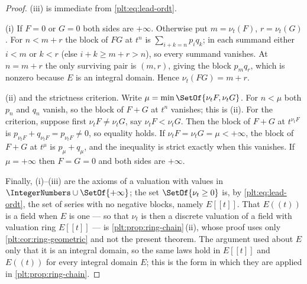 \documentclass[11pt,oneside]{article}
\theoremstyle{plain}
\theoremstyle{definition}
\theoremstyle{remark}
\newcommand{\ordt}{\nu_{t}}                              %
\begin{document}
\begin{proof}
(iii) is immediate from \eqref{plt:eq:lead-ordt}.

(i)  If \(F=0\) or \(G=0\) both sides are \(+\infty\).  Otherwise put
\(m=\ordt(F)\), \(r=\ordt(G)\).  For \(n<m+r\) the block of \(FG\) at \(t^n\)
is \(\sum_{i+k=n}p_iq_k\); in each summand either \(i<m\) or \(k<r\) (else
\(i+k\ge m+r>n\)), so every summand vanishes.  At \(n=m+r\) the only
surviving pair is \((m,r)\), giving the block \(p_mq_r\), which is nonzero
because \(E\) is an integral domain.  Hence \(\ordt(FG)=m+r\).

(ii) and the strictness criterion.  Write \(\mu=\min\SetOf{\ordt F,\ordt G}\).
For \(n<\mu\) both \(p_n\) and \(q_n\) vanish, so the block of \(F+G\) at
\(t^n\) vanishes; this is (ii).  For the criterion, suppose first
\(\ordt F\ne\ordt G\), say \(\ordt F<\ordt G\).  Then the block of \(F+G\) at
\(t^{\ordt F}\) is \(p_{\ordt F}+q_{\ordt F}=p_{\ordt F}\ne0\), so equality
holds.  If \(\ordt F=\ordt G=\mu<+\infty\), the block of \(F+G\) at \(t^\mu\)
is \(p_\mu+q_\mu\), and the inequality is strict exactly when this vanishes.
If \(\mu=+\infty\) then \(F=G=0\) and both sides are \(+\infty\).

Finally, (i)--(iii) are the axioms of a valuation with values in
\(\IntegerNumbers\cup\SetOf{+\infty}\); the set \(\SetOf{\ordt\ge0}\) is, by
\eqref{plt:eq:lead-ordt}, the set of series with no negative blocks, namely
\(E[[t]]\).  That \(E((t))\) is a field when \(E\) is one --- so that
\(\ordt\) is then a discrete valuation of a field with valuation ring
\(E[[t]]\) --- is \cref{plt:prop:ring-chain}\,(ii), whose proof uses only
\cref{plt:cor:ring-geometric} and not the present theorem.
The argument used about \(E\) only that it is
an integral domain, so the same laws hold in \(E[[t]]\) and \(E((t))\) for
every integral domain \(E\); this is the form in which they are applied in
\cref{plt:prop:ring-chain}.
\end{proof}
\end{document}
